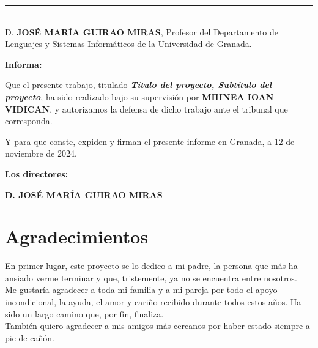 \noindent\rule[-1ex]{\textwidth}{2pt}\\[4.5ex]

D. \textbf{JOSÉ MARÍA GUIRAO MIRAS}, Profesor del Departamento de Lenguajes y Sistemas Informáticos de la Universidad de Granada.

\vspace{0.5cm}

\textbf{Informa:}

\vspace{0.5cm}

Que el presente trabajo, titulado \textit{\textbf{Título del proyecto, Subtítulo del proyecto}},
ha sido realizado bajo su supervisión por \textbf{MIHNEA IOAN VIDICAN}, y autorizamos la defensa de dicho trabajo ante el tribunal
que corresponda.

\vspace{0.5cm}

Y para que conste, expiden y firman el presente informe en Granada, a 12 de noviembre de 2024.

\vspace{1cm}

\textbf{Los directores:}

\vspace{5cm}

\noindent \textbf{D. JOSÉ MARÍA GUIRAO MIRAS}

\chapter*{Agradecimientos}
\thispagestyle{empty}

       \vspace{1cm}

En primer lugar, este proyecto se lo dedico a mi padre, la persona que más ha ansiado verme terminar y que, tristemente, ya no se encuentra entre nosotros. \\

Me gustaría agradecer a toda mi familia y a mi pareja por todo el apoyo incondicional, la ayuda, el amor y cariño recibido durante todos estos años. Ha sido un largo camino que, por fin, finaliza. \\

También quiero agradecer a mis amigos más cercanos por haber estado siempre a pie de cañón.\\



